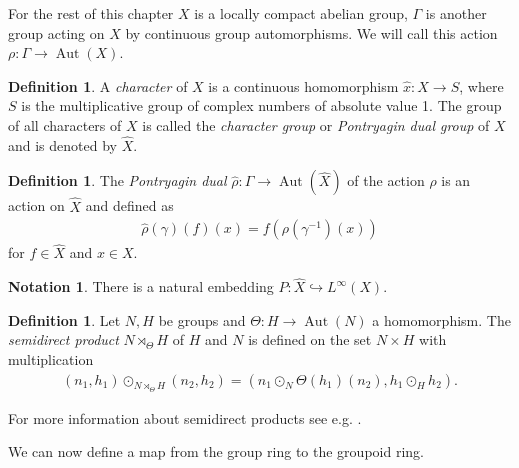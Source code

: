 \documentclass[12pt,a4paper]{scrartcl}
\theoremstyle{plain}
\theoremstyle{definition}
\newtheorem{Definition}[Theorem]{Definition}
\newtheorem{Notation}[Theorem]{Notation}
\newcommand{\2}{\mathbb{Z} / 2 \mathbb{Z}}
\newcommand{\1}{\bar{1}}
\newcommand{\0}{\bar{0}}
\newcommand{\Aut}{\operatorname{Aut}}
\begin{document}
For the rest of this chapter $X$ is a locally compact abelian group, $\Gamma$ is another group acting on $X$ by continuous group automorphisms. We will call this action $\rho\colon\Gamma \to \Aut(X)$.
\begin{Definition}
	A \emph{character} of $X$ is a continuous homomorphism $\hat{x}\colon X \to S$, where $S$ is the multiplicative group of complex numbers of absolute value 1. The group of all characters of $X$ is called the \emph{character group} or \emph{Pontryagin dual group} of $X$ and is denoted by $\hat{X}$.
\end{Definition}
\begin{Definition}
	The \emph{Pontryagin dual} $\hat{\rho}\colon\Gamma \to \Aut(\hat{X})$ of the action $\rho$ is an action on $\hat{X}$ and defined as
	\begin{align*}
		\hat{\rho}(\gamma)(f)(x) = f(\rho(\gamma^{-1})(x))
	\end{align*}
	for $f \in \hat{X}$ and $x \in X$.
\end{Definition}
\begin{Notation}
	There is a natural embedding $P \colon \hat{X} \hookrightarrow L^{\infty}(X)$.
\end{Notation}
\begin{Definition}
	Let $N, H$ be groups and $\Theta \colon H \to \Aut(N)$ a homomorphism. The \emph{semidirect product} $N \rtimes_\Theta H$ of $H$ and $N$ is defined on the set $N \times H$ with multiplication 
	\begin{align*}
		(n_1, h_1) \odot_{N \rtimes_\Theta H} (n_2, h_2) = (n_1 \odot_N \Theta(h_1)(n_2), h_1 \odot_H h_2).
	\end{align*}
\end{Definition}

For more information about semidirect products see e.g. \cite{ALG}.

We can now define a map from the group ring to the groupoid ring. 
\end{document}
